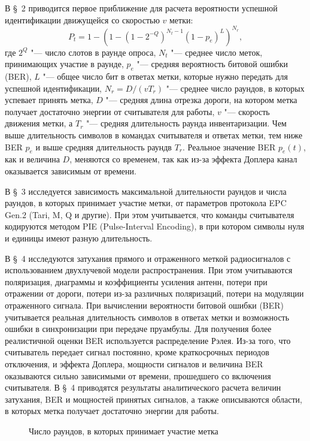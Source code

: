 В \S~2 приводится первое приближение для расчета вероятности успешной идентификации движущейся со скоростью $v$ метки:
\[
P_t = 1 - \left( 1 - (1 - 2^{-Q})^{N_t-1} (1 - p_e)^L \right)^{N_r},
\]
где $2^Q$ "--- число слотов в раунде опроса, $N_t$ "--- среднее число меток, принимающих участие в раунде, $p_e$ "--- средняя вероятность битовой ошибки (BER), $L$ "--- общее число бит в ответах метки, которые нужно передать для успешной идентификации, $N_r = D / (v T_r)$ "--- среднее число раундов, в которых успевает принять метка, $D$ "--- средняя длина отрезка дороги, на котором метка получает достаточно энергии от считывателя для работы, $v$ "--- скорость движения метки, а $T_r$ "--- средняя длительность раунда инвентаризации. Чем выше длительность символов в командах считывателя и ответах метки, тем ниже BER $p_e$ и выше средняя длительность раундв $T_r$. Реальное значение BER $p_e(t)$, как и величина $D$, меняются со временем, так как из-за эффекта Доплера канал оказывается зависимым от времени.

В \S~3 исследуется зависимость максимальной длительности раундов и числа раундов, в которых принимает участие метки, от параметров протокола EPC Gen.2 (Tari, M, Q и другие). При этом учитывается, что команды считывателя кодируются методом PIE (Pulse-Interval Encoding), в при котором символы нуля и единицы имеют разную длительность.

В \S~4 исследуются затухания прямого и отраженного меткой радиосигналов с использованием двухлучевой модели распространения. При этом учитываются поляризация, диаграммы и коэффициенты усиления антенн, потери при отражении от дороги, потери из-за различных поляризаций, потери на модуляции отраженного сигнала. При вычислении вероятности битовой ошибки (BER) учитывается реальная длительность символов в ответах метки и  возможность ошибки в синхронизации при передаче пруамбулы. Для получения более реалистичной оценки BER используется распределение Рэлея. Из-за того, что считыватель передает сигнал постоянно, кроме краткосрочных периодов отключения, и эффекта Доплера, мощности сигналов и величина BER оказываются сильно зависимыми от времени, прошедшего со включения считывателя. В \S~4 приводятся результаты аналитического расчета величин затухания, BER и мощностей принятых сигналов, а также описываются области, в которых метка получает достаточно энергии для работы. 

\begin{figure}[ht]
  \caption{Число раундов, в которых принимает участие метка}\label{fig:rounds_per_tag}
\end{figure}

